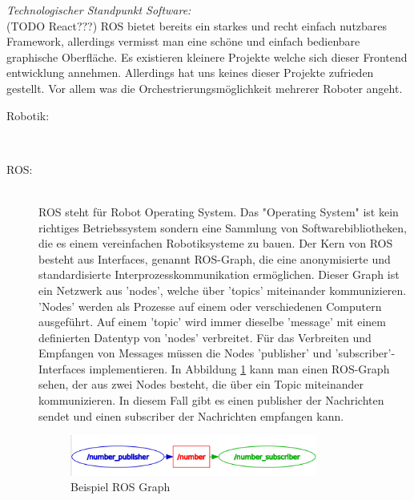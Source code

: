 \begin{flushleft}
    \textit{Technologischer Standpunkt Software:}\\
    (TODO React???)
    ROS bietet bereits ein starkes und recht einfach nutzbares Framework, allerdings vermisst man eine 
    schöne und einfach bedienbare graphische Oberfläche.
    Es existieren kleinere Projekte welche sich dieser Frontend entwicklung annehmen. 
    Allerdings hat uns keines dieser Projekte zufrieden gestellt. 
    Vor allem was die Orchestrierungsmöglichkeit mehrerer Roboter angeht.

    \begin{description}
        \item[Robotik:]\hfill\\
        

        \item[ROS:]\hfill\\
        ROS steht für Robot Operating System. Das "Operating System" ist kein richtiges Betriebssystem sondern eine Sammlung von Softwarebibliotheken, die es einem vereinfachen Robotiksysteme zu bauen.
        Der Kern von ROS besteht aus Interfaces, genannt ROS-Graph, die eine anonymisierte und standardisierte Interprozesskommunikation ermöglichen.
        Dieser Graph ist ein Netzwerk aus 'nodes', welche über 'topics' miteinander kommunizieren. 'Nodes' werden als Prozesse auf einem oder verschiedenen Computern ausgeführt.
        Auf einem 'topic' wird immer dieselbe 'message' mit einem definierten Datentyp von 'nodes' verbreitet. 
        Für das Verbreiten und Empfangen von Messages müssen die Nodes 'publisher' und 'subscriber'-Interfaces implementieren.
        In Abbildung \ref{fig:ros_graph} kann man einen ROS-Graph sehen, der aus zwei Nodes besteht, die über ein Topic miteinander kommunizieren.
        In diesem Fall gibt es einen publisher der Nachrichten sendet und einen subscriber der Nachrichten empfangen kann.

        \begin{figure}[h!]
            \centering
            \includegraphics[width=0.8\textwidth]{imgs/Grundbegriffe/graph_2_nodes_with_topic.png}
            \caption{Beispiel ROS Graph}
            \label{fig:ros_graph}%
        \end{figure}


\end{description}
\end{flushleft}
